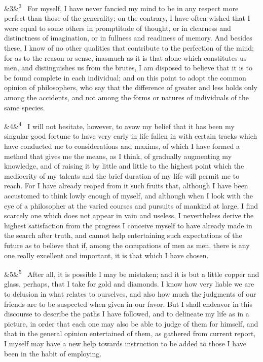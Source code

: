 \documentclass[12pt]{article}
\newcommand{\para}[1][]{\par\noindent\ifx&#1&\else\textsuperscript{\footnotesize #1}~\fi}
\begin{document}
\para[3] For myself, I have never fancied my mind to be in any respect more perfect than those of the generality; on the contrary, I have often wished that I were equal to some others in promptitude of thought, or in clearness and distinctness of imagination, or in fullness and readiness of memory. And besides these, I know of no other qualities that contribute to the perfection of the mind; for as to the reason or sense, inasmuch as it is that alone which constitutes us men, and distinguishes us from the brutes, I am disposed to believe that it is to be found complete in each individual; and on this point to adopt the common opinion of philosophers, who say that the difference of greater and less holds only among the accidents, and not among the forms or natures of individuals of the same species.

\para[4] I will not hesitate, however, to avow my belief that it has been my singular good fortune to have very early in life fallen in with certain tracks which have conducted me to considerations and maxims, of which I have formed a method that gives me the means, as I think, of gradually augmenting my knowledge, and of raising it by little and little to the highest point which the mediocrity of my talents and the brief duration of my life will permit me to reach. For I have already reaped from it such fruits that, although I have been accustomed to think lowly enough of myself, and although when I look with the eye of a philosopher at the varied courses and pursuits of mankind at large, I find scarcely one which does not appear in vain and useless, I nevertheless derive the highest satisfaction from the progress I conceive myself to have already made in the search after truth, and cannot help entertaining such expectations of the future as to believe that if, among the occupations of men as men, there is any one really excellent and important, it is that which I have chosen.

\para[5] After all, it is possible I may be mistaken; and it is but a little copper and glass, perhaps, that I take for gold and diamonds. I know how very liable we are to delusion in what relates to ourselves, and also how much the judgments of our friends are to be suspected when given in our favor. But I shall endeavor in this discourse to describe the paths I have followed, and to delineate my life as in a picture, in order that each one may also be able to judge of them for himself, and that in the general opinion entertained of them, as gathered from current report, I myself may have a new help towards instruction to be added to those I have been in the habit of employing.
\end{document}
